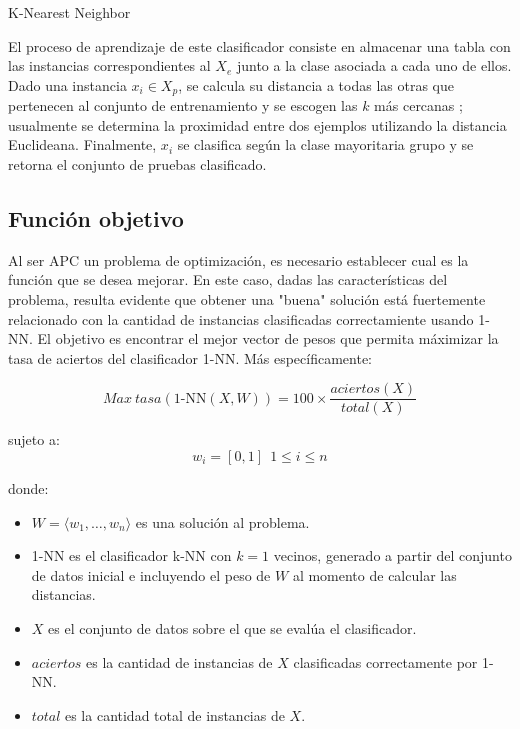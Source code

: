 \documentclass{ci5652}
\begin{document}
\begin{algorithm}
 \DontPrintSemicolon
 \vspace*{0.1cm}
 \vspace*{0.1cm}
 \caption{K-Nearest Neighbor}
\end{algorithm}

El proceso de aprendizaje de este clasificador consiste en almacenar una tabla
con las instancias correspondientes al $X_e$ junto a la clase asociada a cada 
uno de ellos. Dado una instancia $x_i \in X_p$, se calcula su distancia a todas
las otras que pertenecen al conjunto de entrenamiento y se escogen las $k$ más
cercanas \cite{Herrera_2017}; usualmente se determina la proximidad entre dos
ejemplos utilizando la distancia Euclideana. Finalmente, $x_i$ se clasifica  
según la clase mayoritaria grupo y se retorna el conjunto de pruebas clasificado.


\subsection{Función objetivo}

Al ser APC un problema de optimización, es necesario establecer cual es la 
función que se desea mejorar. En este caso, dadas las características del
problema, resulta evidente que obtener una "buena" solución está fuertemente
relacionado con la cantidad de instancias clasificadas correctamiente usando
1-NN. El objetivo es encontrar el mejor vector de pesos que permita máximizar la
tasa de aciertos del clasificador 1-NN. Más específicamente:

\begin{equation}
  Max\ tasa(\text{1-NN}(X, W)) = 100 \times \frac{aciertos(X)}{total(X)}
\end{equation}

sujeto a:
\[
w_i = [0, 1] \ \ 1 \leq i \leq n
\]

donde:
\begin{itemize}
  \item $W = \langle w_1, \dots, w_n\rangle$ es una solución al problema.
  \item 1-NN es el clasificador k-NN con $k=1$ vecinos, generado a partir del
  conjunto de datos inicial e incluyendo el peso de $W$ al momento de calcular 
  las distancias.
  \item $X$ es el conjunto de datos sobre el que se evalúa el clasificador.
  \item $aciertos$ es la cantidad de instancias de $X$ clasificadas 
  correctamente por 1-NN.
  \item $total$ es la cantidad total de instancias de $X$.
\end{itemize}
\end{document}
